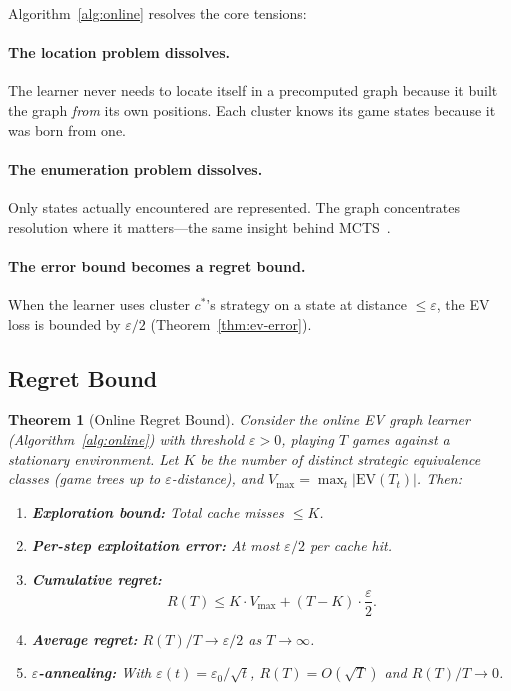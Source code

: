 \documentclass[11pt]{article}
\newtheorem{theorem}{Theorem}[section]
\newcommand{\EV}{\mathrm{EV}}
\begin{document}
Algorithm~\ref{alg:online} resolves the core tensions:

\paragraph{The location problem dissolves.} The learner never needs to
locate itself in a precomputed graph because it built the graph
\emph{from} its own positions. Each cluster knows its game states
because it was born from one.

\paragraph{The enumeration problem dissolves.} Only states actually
encountered are represented. The graph concentrates resolution where it
matters---the same insight behind MCTS~\citep{coulom2006efficient}.

\paragraph{The error bound becomes a regret bound.}  When the learner
uses cluster $c^*$'s strategy on a state at distance $\le \varepsilon$,
the EV loss is bounded by $\varepsilon/2$ (Theorem~\ref{thm:ev-error}).

\subsection{Regret Bound}

\begin{theorem}[Online Regret Bound]
\label{thm:regret}
Consider the online EV graph learner (Algorithm~\ref{alg:online}) with
threshold $\varepsilon > 0$, playing $T$ games against a stationary
environment. Let $K$ be the number of distinct strategic equivalence
classes (game trees up to $\varepsilon$-distance), and $V_{\max} =
\max_t |\EV(T_t)|$. Then:

\begin{enumerate}[nosep]
  \item \textbf{Exploration bound:} Total cache misses $\le K$.
  \item \textbf{Per-step exploitation error:} At most $\varepsilon/2$
    per cache hit.
  \item \textbf{Cumulative regret:}
    \[
      R(T) \le K \cdot V_{\max} + (T - K) \cdot
      \frac{\varepsilon}{2}.
    \]
  \item \textbf{Average regret:} $R(T)/T \to \varepsilon/2$ as $T \to
    \infty$.
  \item \textbf{$\varepsilon$-annealing:} With $\varepsilon(t) =
    \varepsilon_0 / \sqrt{t}$, $R(T) = O(\sqrt{T})$ and $R(T)/T \to 0$.
\end{enumerate}
\end{theorem}
\end{document}
